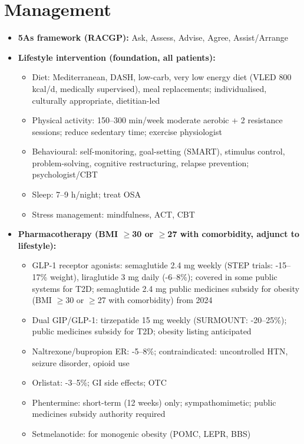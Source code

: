 \section*{Management}
\begin{itemize}
    \item \textbf{5As framework (RACGP):} Ask, Assess, Advise, Agree, Assist/Arrange
    \item \textbf{Lifestyle intervention (foundation, all patients):}
    \begin{itemize}
        \item Diet: Mediterranean, DASH, low-carb, very low energy diet (VLED 800 kcal/d, medically supervised), meal replacements; individualised, culturally appropriate, dietitian-led
        \item Physical activity: 150--300 min/week moderate aerobic + 2 resistance sessions; reduce sedentary time; exercise physiologist
        \item Behavioural: self-monitoring, goal-setting (SMART), stimulus control, problem-solving, cognitive restructuring, relapse prevention; psychologist/CBT
        \item Sleep: 7--9 h/night; treat OSA
        \item Stress management: mindfulness, ACT, CBT
    \end{itemize}
    \item \textbf{Pharmacotherapy (BMI $\ge$30 or $\ge$27 with comorbidity, adjunct to lifestyle):}
    \begin{itemize}
        \item GLP-1 receptor agonists: semaglutide 2.4 mg weekly (STEP trials: -15--17\% weight), liraglutide 3 mg daily (-6--8\%); covered in some public systems for T2D; semaglutide 2.4 mg public medicines subsidy for obesity (BMI $\ge$30 or $\ge$27 with comorbidity) from 2024
        \item Dual GIP/GLP-1: tirzepatide 15 mg weekly (SURMOUNT: -20--25\%); public medicines subsidy for T2D; obesity listing anticipated
        \item Naltrexone/bupropion ER: -5--8\%; contraindicated: uncontrolled HTN, seizure disorder, opioid use
        \item Orlistat: -3--5\%; GI side effects; OTC
        \item Phentermine: short-term (12 weeks) only; sympathomimetic; public medicines subsidy authority required
        \item Setmelanotide: for monogenic obesity (POMC, LEPR, BBS)
    \end{itemize}

\end{itemize}
